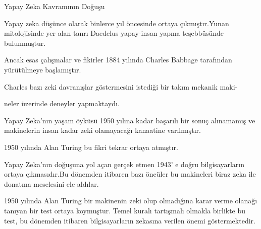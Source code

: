 \documentclass{beamer}                                                                                          %
\begin{document}
	\begin{frame}{Yapay Zeka Kavramının Doğuşu}
        \begin{center}
		\justifying
		    \color{myred1} \color{black}Yapay zeka düşünce olarak binlerce yıl öncesinde ortaya çıkmıştır.Yunan mitolojisinde yer alan tanrı Daedelus yapay-insan yapma teşebbüsünde bulunmuştur.\par \vspace{15}
            \color{myred1} \color{black}Ancak esas çalışmalar ve fikirler 1884 yılında Charles Babbage tarafından yürütülmeye başlamıştır.\par \vspace{15}
            \color{myred1} \color{black}Charles bazı zeki davranışlar göstermesini istediği bir takım mekanik maki-\par neler üzerinde deneyler yapmaktaydı.

	    \end{center}
	\end{frame}
	
    
    \begin{frame}{Yapay Zeka'nın yaşam öyküsü}
        \justifying
            \color{myred1} \color{black}1950 yılına kadar başarılı bir sonuç alınamamış ve makinelerin insan kadar zeki olamayacağı kanaatine varılmıştır.\par \vspace{10}
            \color{myred1} \color{black}1950 yılında Alan Turing bu fikri tekrar ortaya atmıştır.\par \vspace{10}
            \color{myred1} \color{black}Yapay Zeka'nın doğuşuna yol açan gerçek etmen 1943’ e doğru bilgisayarların ortaya çıkmasıdır.Bu dönemden itibaren bazı öncüler bu makineleri biraz zeka ile donatma meselesini ele aldılar.\par \vspace{10}
            \color{myred1} \color{black}1950 yılında Alan Turing bir makinenin zeki olup olmadığına karar verme olanağı tanıyan bir test ortaya koymuştur. Temel kuralı tartışmalı olmakla birlikte bu test, bu dönemden itibaren bilgisayarların zekasına verilen önemi göstermektedir.
    \end{frame}

	
\end{document}
